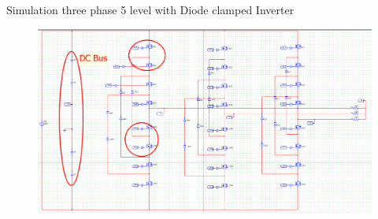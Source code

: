 \documentclass[
	11pt, %
]{beamer}
\begin{document}
\begin{frame}{Simulation three phase 5 level with Diode clamped Inverter}
    \begin{figure}
        \includegraphics[width=1\linewidth]{simulation_Schematic.png}
    \end{figure}
\end{frame}


\end{document}
